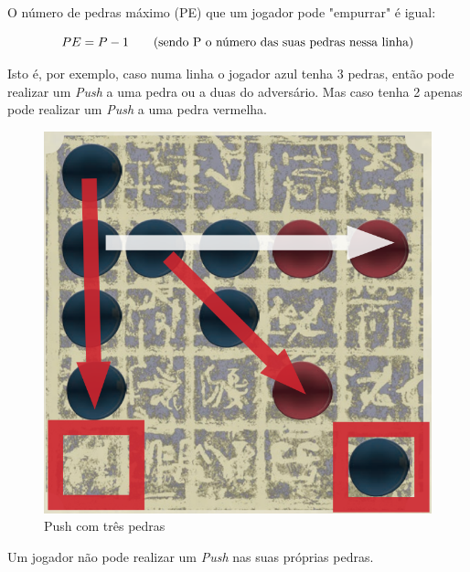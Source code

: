 \documentclass[a4paper]{article}
\begin{document}
\newpage

O número de pedras máximo (PE) que um jogador pode "empurrar" é igual:

\begin{equation}
PE = P - 1 \text{\hspace{7mm}(sendo P o número das suas pedras nessa linha)}
\end{equation}

Isto é, por exemplo, caso numa linha o jogador azul tenha 3 pedras, então pode realizar um  \textit{Push} a uma pedra ou a duas do adversário. Mas caso tenha 2 apenas pode realizar um  \textit{Push} a uma pedra vermelha.

\begin{figure}[!htb]
\centering
\includegraphics[scale=0.3]{push2.png}
\caption{Push com três pedras}
\end{figure}

Um jogador não pode realizar um  \textit{Push} nas suas próprias pedras.
\end{document}
